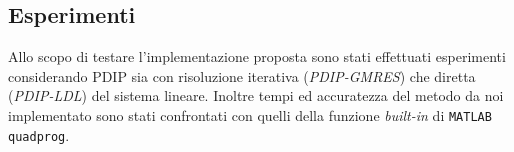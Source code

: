 
\subsection{Esperimenti}
Allo scopo di testare l'implementazione proposta sono stati effettuati esperimenti considerando PDIP sia con risoluzione iterativa (\emph{PDIP-GMRES}) che diretta (\textit{PDIP-LDL}) del sistema lineare.
Inoltre tempi ed accuratezza del metodo da noi implementato sono stati confrontati con quelli della funzione \textit{built-in} di \texttt{MATLAB} \texttt{quadprog}.

